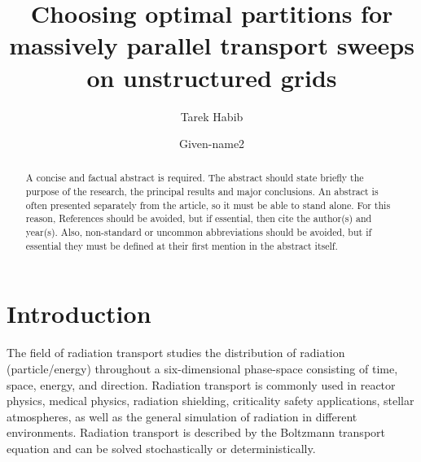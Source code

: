 \documentclass[times,final]{elsarticle}
\begin{document}

\begin{frontmatter}

\title{Choosing optimal partitions for massively parallel transport sweeps on unstructured grids}%

\author[1]{Tarek Habib }%
\author[1]{Given-name2 }

\address[1]{Department of Nuclear Engineering, Texas A\&M University, College Station, TX 77843, USA}



\begin{abstract}
A concise and factual abstract is required. The abstract should state briefly the purpose of the research, the principal results and major conclusions. An abstract is often presented separately from the article, so it must be able to stand alone. For this reason, References should be avoided, but if essential, then cite the author(s) and year(s). Also, non-standard or uncommon abbreviations should be avoided, but if essential they must be defined at their first mention in the abstract itself.
\end{abstract}


\end{frontmatter}


\section{Introduction}

The field of radiation transport studies the distribution of radiation (particle/energy) throughout a six-dimensional phase-space consisting of time, space, energy, and direction. 
Radiation transport is commonly used in reactor physics, medical physics, radiation shielding, criticality safety applications, stellar atmospheres, as well as the general simulation of radiation in different environments. 
Radiation transport is described by the Boltzmann transport equation \cite{bell_glasstone,zweifel,davison,duderstadt} and can be solved stochastically or deterministically.
\end{document}
